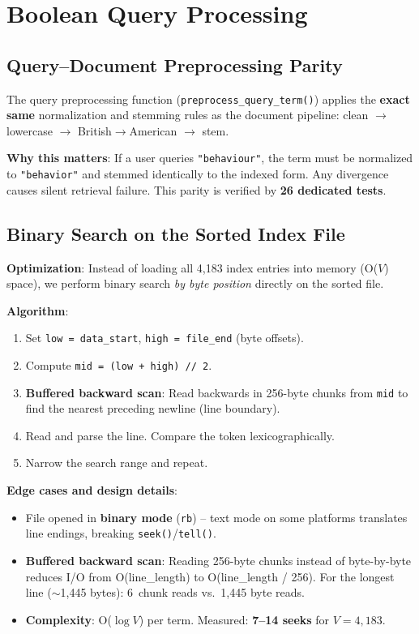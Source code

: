 \documentclass[12pt,a4paper]{article}
\begin{document}
\section{Boolean Query Processing}
\label{sec:query}

\subsection{Query--Document Preprocessing Parity}
\label{sec:parity}

The query preprocessing function (\texttt{preprocess\_query\_term()}) applies the
\textbf{exact same} normalization and stemming rules as the document pipeline:
clean $\to$ lowercase $\to$ British$\to$American $\to$ stem.

\textbf{Why this matters}: If a user queries \texttt{"behaviour"}, the term must
be normalized to \texttt{"behavior"} and stemmed identically to the indexed form.
Any divergence causes silent retrieval failure.
This parity is verified by \textbf{26 dedicated tests}.

\subsection{Binary Search on the Sorted Index File}
\label{sec:bsearch}

\textbf{Optimization}: Instead of loading all 4,183 index entries into memory
(O($V$) space), we perform binary search \textit{by byte position} directly on
the sorted file.

\textbf{Algorithm}:
\begin{enumerate}[noitemsep]
  \item Set \texttt{low = data\_start}, \texttt{high = file\_end} (byte offsets).
  \item Compute \texttt{mid = (low + high) // 2}.
  \item \textbf{Buffered backward scan}: Read backwards in 256-byte chunks from
        \texttt{mid} to find the nearest preceding newline (line boundary).
  \item Read and parse the line. Compare the token lexicographically.
  \item Narrow the search range and repeat.
\end{enumerate}

\textbf{Edge cases and design details}:
\begin{itemize}[noitemsep]
  \item File opened in \textbf{binary mode} (\texttt{rb}) -- text mode on some
        platforms translates line endings, breaking \texttt{seek()}/\texttt{tell()}.
  \item \textbf{Buffered backward scan}: Reading 256-byte chunks instead of
        byte-by-byte reduces I/O from O(line\_length) to
        O(line\_length / 256).  For the longest line ($\sim$1,445 bytes):
        6~chunk reads vs.\ 1,445 byte reads.
  \item \textbf{Complexity}: O($\log V$) per term. Measured: \textbf{7--14 seeks}
        for $V = 4{,}183$.
\end{itemize}
\end{document}
